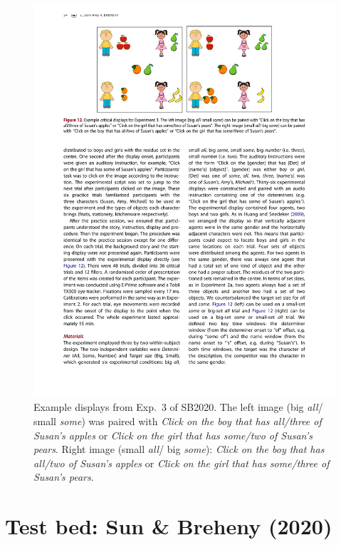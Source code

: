 \documentclass[10pt,letterpaper]{article}
\newcommand{\expref}[1]{Exp.~#1}
\begin{document}
\begin{figure}[H]
\centering
\includegraphics[width=.9\columnwidth]{images/display}
\caption{Example displays from \expref{3} of SB2020. The left image (big \emph{all}/ small  \emph{some}) was paired with  \emph{Click on the boy that has all/three of Susan's apples} or  \emph{Click on the girl that has some/two of Susan's pears}. Right image (small  \emph{all}/ big  \emph{some}):  \emph{Click on the boy that has all/two of Susan's apples} or  \emph{Click on the girl that has some/three of Susan's pears}.} 
\label{fig:display}
\end{figure}

\section{Test bed: Sun \& Breheny (2020)}
\end{document}
